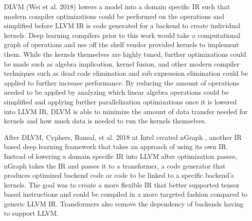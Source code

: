 DLVM \cite{dlvm} (Wei et al. 2018) lowers a model into a domain specific IR
such that modern compiler optimizations could be performed on the operations
and simplified before LLVM IR is code generated for a backend to create
individual kernels. Deep learning compilers \cite{tensorflow} \cite{torch}
prior to this work would take a computational graph of operations and use off
the shelf vendor provided kernels to implement them. While the kernels
themselves are highly tuned, further optimizations could be made such as
algebra implication, kernel fusion, and other modern compiler techniques such
as dead code elimination and sub expression elimination could be applied to
further increase performance. By reducing the amount of operations needed to be
applied by analyzing which linear algebra operations could be simplified and
applying further parallelization optimizations once it is lowered into LLVM IR,
DLVM is able to minimize the amount of data transfer needed for kernels and how
much data is needed to run the kernels themselves.

After DLVM, Cyphers, Bansal, et al. 2018 at Intel created nGraph \cite{nGraph},
another IR based deep learning framework that takes an approach of using its
own IR. Instead of lowering a domain specific IR into LLVM after optimization
passes, nGraph takes the IR and passes it to a transformer, a code generator
that produces optimized backend code or code to be linked to a specific
backend's kernels. The goal was to create a more flexible IR that better supported
tensor based instructions and could be compiled in a more targeted fashion compared
to generic LLVM IR. Transformers also remove the dependency of backends having
to support LLVM.

